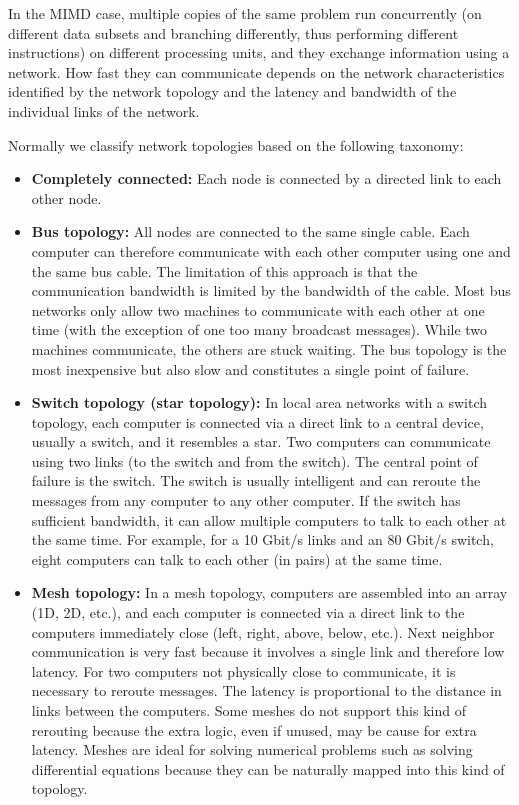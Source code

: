 \documentclass[justified, sixbynine]{tufte-book}
\theoremstyle{plain}%
\newtheorem * {corollary}{Corollary}
\theoremstyle{definition}
\theoremstyle{remark}
\newtheorem * {remark}{Remark}
\newtheorem * {note}{Note}
\begin{document}
\begin{fullwidth}
In the MIMD case, multiple copies of the same problem run concurrently (on different data subsets and branching differently, thus performing different instructions) on different processing units, and they exchange information using a network. How fast they can communicate depends on the network characteristics identified by the network topology and the latency and bandwidth of the individual links of the network.

Normally we classify network topologies based on the following taxonomy:

\begin{itemize}
\item {\bf Completely connected:}
Each node is connected by a directed link to each other node.
\item {\bf Bus topology:}
All nodes are connected to the same single cable. Each computer can therefore communicate with each other computer using one and the same bus cable. The limitation of this approach is that the communication bandwidth is limited by the bandwidth of the cable. Most bus networks only allow two machines to communicate with each other at one time (with the exception of one too many broadcast messages). While two machines communicate, the others are stuck waiting.
The bus topology is the most inexpensive but also slow and constitutes a single point of failure.
\item {\bf Switch topology (star topology):}
In local area networks with a switch topology, each computer is connected via a direct link to a central device, usually a switch, and it resembles a star. Two computers can communicate using two links (to the switch and from the switch). The central point of failure is the switch. The switch is usually intelligent and can reroute the messages from any computer to any other computer. If the switch has sufficient bandwidth, it can allow multiple computers to talk to each other at the same time. For example, for a 10 Gbit/s links and an 80 Gbit/s switch, eight computers can talk to each other (in pairs) at the same time.
\item {\bf Mesh topology:}
In a mesh topology, computers are assembled into an array (1D, 2D, etc.), and each computer is connected via a direct link to the computers immediately close (left, right, above, below, etc.). Next neighbor communication is very fast because it involves a single link and therefore low latency. For two computers not physically close to communicate, it is necessary to reroute messages. The latency is proportional to the distance in links between the computers. Some meshes do not support this kind of rerouting because the extra logic, even if unused, may be cause for extra latency. Meshes are ideal for solving numerical problems such as solving differential equations because they can be naturally mapped into this kind of topology.

\end{itemize}
\end{fullwidth}
\end{document}
